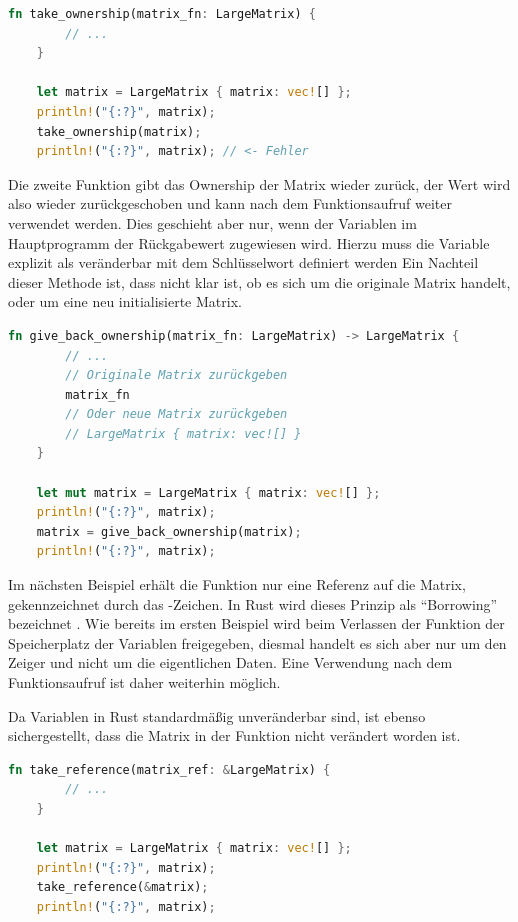 \documentclass[11pt,a4paper, ngerman]{article}
\begin{document}
 \begin{lstlisting}[language=rust, caption={Einführendes Beispiel: Ownership abgeben}]
    fn take_ownership(matrix_fn: LargeMatrix) {
        // ...
    }

    let matrix = LargeMatrix { matrix: vec![] };
    println!("{:?}", matrix);
    take_ownership(matrix);
    println!("{:?}", matrix); // <- Fehler
\end{lstlisting}

Die zweite Funktion gibt das Ownership der Matrix wieder zurück, der Wert wird also wieder zurückgeschoben und kann nach dem Funktionsaufruf weiter verwendet werden. Dies geschieht aber nur, wenn der Variablen im Hauptprogramm der Rückgabewert zugewiesen wird. Hierzu muss die Variable  explizit als veränderbar mit dem Schlüsselwort  definiert werden Ein Nachteil dieser Methode ist, dass nicht klar ist, ob es sich um die originale Matrix handelt, oder um eine neu initialisierte Matrix.

\begin{lstlisting}[language=rust, caption={Einführendes Beispiel: Ownership zurückgeben}]
    fn give_back_ownership(matrix_fn: LargeMatrix) -> LargeMatrix {
        // ...
        // Originale Matrix zurückgeben
        matrix_fn
        // Oder neue Matrix zurückgeben
        // LargeMatrix { matrix: vec![] }
    }

    let mut matrix = LargeMatrix { matrix: vec![] };
    println!("{:?}", matrix);
    matrix = give_back_ownership(matrix);
    println!("{:?}", matrix);
\end{lstlisting}

Im nächsten Beispiel erhält die Funktion nur eine Referenz auf die Matrix, gekennzeichnet durch das \codeword{&}-Zeichen. In Rust wird dieses Prinzip als ``Borrowing'' bezeichnet \cite{RustBorrowing}. Wie bereits im ersten Beispiel wird beim Verlassen der Funktion der Speicherplatz der Variablen freigegeben, diesmal handelt es sich aber nur um den Zeiger und nicht um die eigentlichen Daten. Eine Verwendung nach dem Funktionsaufruf ist daher weiterhin möglich.

Da Variablen in Rust standardmäßig unveränderbar sind, ist ebenso sichergestellt, dass die Matrix in der Funktion nicht verändert worden ist. 

\begin{lstlisting}[language=rust, caption={Einführendes Beispiel: Unveränderliche Referenz}]
    fn take_reference(matrix_ref: &LargeMatrix) {
        // ...
    }

    let matrix = LargeMatrix { matrix: vec![] };
    println!("{:?}", matrix);
    take_reference(&matrix);
    println!("{:?}", matrix);
\end{lstlisting}
\end{document}
